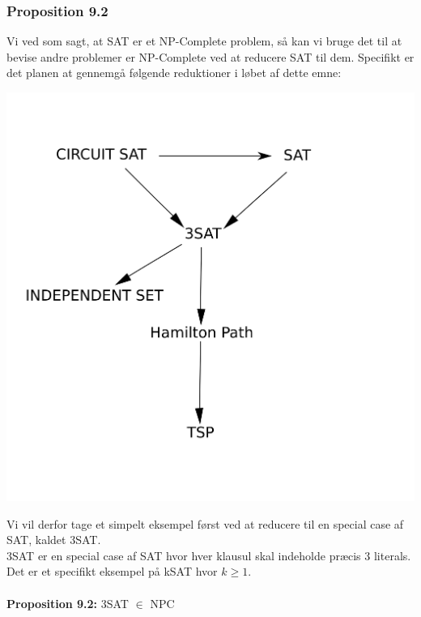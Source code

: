\subsubsection{Proposition 9.2}

Vi ved som sagt, at SAT er et NP-Complete problem, så kan vi bruge det til at
bevise andre problemer er NP-Complete ved at reducere SAT til dem.
Specifikt er det planen at gennemgå følgende reduktioner i løbet af dette emne:
\begin{center}
 \includegraphics[bb=0 0 400 400,scale=0.5]{img/GraphReductionTree.png}
\end{center}

Vi vil derfor tage et simpelt eksempel først ved at reducere til en special
case af SAT, kaldet 3SAT.\\

3SAT er en special case af SAT hvor hver klausul skal indeholde præcis 3
literals. Det er et specifikt eksempel på kSAT hvor $k \geq 1$.\\
~\\
\textbf{Proposition 9.2:} 3SAT $\in$ NPC

